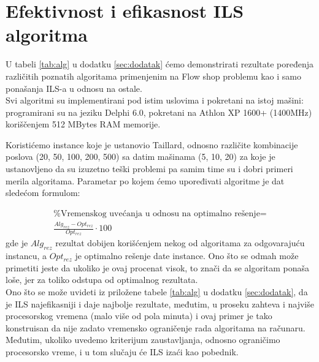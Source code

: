 \documentclass[a4paper]{article}
\begin{document}
\section{Efektivnost i efikasnost ILS algoritma}
U tabeli \ref{tab:alg} u dodatku \ref{sec:dodatak} ćemo demonstrirati rezultate poređenja različitih poznatih algoritama primenjenim na Flow shop problemu kao i samo ponašanja ILS-a u odnosu na ostale. \\
Svi algoritmi su implementirani pod istim uslovima i pokretani na istoj mašini: programirani su na jeziku Delphi 6.0, pokretani na Athlon XP 1600+ (1400MHz) koriščenjem 512 MBytes RAM memorije. 

Koristićemo instance koje je ustanovio Taillard, odnosno različite kombinacije poslova (20, 50, 100, 200, 500) sa datim mašinama (5, 10, 20) za koje je ustanovljeno da su izuzetno teški problemi pa samim time su i dobri primeri merila algoritama. Parametar po kojem ćemo upoređivati algoritme je dat sledećom formulom:

\begin{gather*}
\textrm{\% Vremenskog uvećanja u odnosu na optimalno rešenje} = \\\frac{Alg_{rez} - Opt_{rez}}{Opt_{rez}} \cdot100
\end{gather*}
gde je $Alg_{rez}$ rezultat dobijen korišćenjem nekog od algoritama za odgovarajuću instancu, a $Opt_{rez}$ je optimalno rešenje date instance. Ono što se odmah može primetiti jeste da ukoliko je ovaj procenat visok, to znači da se algoritam ponaša loše, jer za toliko odstupa od optimalnog rezultata.
\\


Ono što se može uvideti iz priložene tabele \ref{tab:alg} u dodatku \ref{sec:dodatak}, da je ILS najefikasniji i daje najbolje rezultate, međutim, u proseku zahteva i najviše procesorskog vremena (malo više od pola minuta) i ovaj primer je tako konstruisan da nije zadato vremensko ograničenje rada algoritama na računaru. Međutim, ukoliko uvedemo kriterijum zaustavljanja, odnosno ograničimo procesorsko vreme, i u tom slučaju će ILS izaći kao pobednik.
\end{document}
